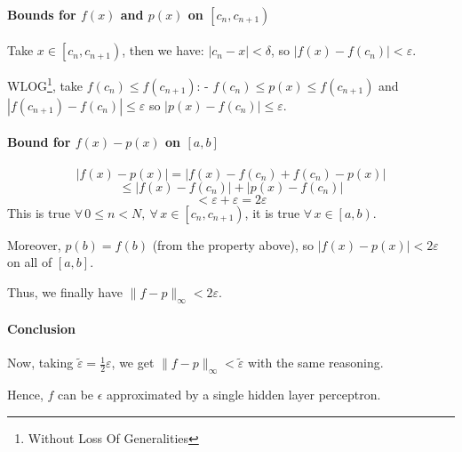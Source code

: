 \documentclass[]{article}
\begin{document}
\paragraph{Bounds for $f(x)$ and $p(x)$ on $\left[ c_n, c_{n+1} \right)$}
Take $x \in \left[ c_n, c_{n+1} \right)$, then we have: $|c_n - x| < \delta$, so $|f(x) - f(c_n)| < \varepsilon$.

WLOG\footnote{Without Loss Of Generalities}, take $f(c_n) \leq f(c_{n+1})$:
- $f(c_n) \leq p(x) \leq f(c_{n+1})$ and $|f(c_{n+1}) - f(c_n)| \leq \varepsilon$ so $|p(x) - f(c_n)| \leq \varepsilon$.

\paragraph{Bound for $f(x) - p(x)$ on $\left[ a,b \right]$}
$$|f(x) - p(x)| = |f(x) - f(c_n) + f(c_n) - p(x)|$$
$$\leq |f(x) - f(c_n)| + |p(x) - f(c_n)|$$
$$< \varepsilon + \varepsilon = 2\varepsilon$$
This is true $\forall\, 0 \leq n < N, \ \forall\, x \in \left[ c_n, c_{n+1} \right)$, it is true $\forall\, x \in \left[ a,b \right)$.

Moreover, $p(b) = f(b)$ (from the property above), so $|f(x) - p(x)| < 2\varepsilon$ on all of $\left[ a,b \right]$.

Thus, we finally have $\|f-p\|_\infty < 2\varepsilon$.

\paragraph{Conclusion}
Now, taking $\tilde{\varepsilon} = \frac{1}{2}\varepsilon$, we get $\|f-p\|_\infty < \tilde{\varepsilon}$ with the same reasoning.

Hence, $f$ can be $\epsilon$ approximated by a single hidden layer perceptron.
\end{document}
